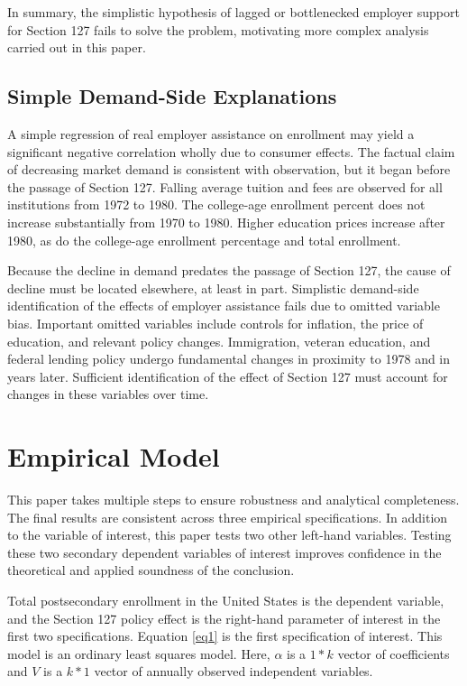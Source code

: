 \documentclass[review]{elsarticle}
\begin{document}
In summary, the simplistic hypothesis of lagged or bottlenecked employer support for Section 127 fails to solve the problem,
motivating more complex analysis carried out in this paper.

\subsection{Simple Demand-Side Explanations}
A simple regression of real employer assistance on enrollment may yield a significant negative correlation wholly due to consumer effects.
The factual claim of decreasing market demand is consistent with observation, but it began before the passage of Section 127.
Falling average tuition and fees are observed for all institutions from 1972 to 1980.
The college-age enrollment percent does not increase substantially from 1970 to 1980.
Higher education prices increase after 1980, as do the college-age enrollment percentage and total enrollment.

Because the decline in demand predates the passage of Section 127, the cause of decline must be located elsewhere, at least in part.
Simplistic demand-side identification of the effects of employer assistance fails due to omitted variable bias.
Important omitted variables include controls for inflation, the price of education, and relevant policy changes.
Immigration, veteran education, and federal lending policy undergo fundamental changes in proximity to 1978 and in years later.
Sufficient identification of the effect of Section 127 must account for changes in these variables over time.

\section{Empirical Model}

This paper takes multiple steps to ensure robustness and analytical completeness.
The final results are consistent across three empirical specifications.
In addition to the variable of interest, this paper tests two other left-hand variables.
Testing these two secondary dependent variables of interest improves confidence in the theoretical and applied soundness of the conclusion.

Total postsecondary enrollment in the United States is the dependent variable,
and the Section 127 policy effect is the right-hand parameter of interest in the first two specifications.
Equation \ref{eq1} is the first specification of interest. This model is an ordinary least squares model.
Here, $\alpha$ is a $1*k$ vector of coefficients and $V$ is a $k*1$ vector of annually observed independent variables.
\end{document}
